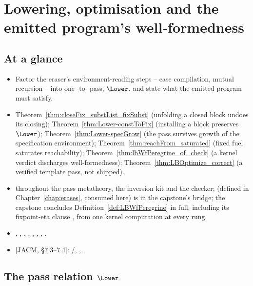 \chapter{Lowering, optimisation and the emitted program's well-formedness}
\label{chap:lowering}

\section*{At a glance}
\begin{itemize}
\item {} Factor the eraser's environment-reading steps -- case compilation, mutual recursion --
into one \lbox{}-to-\lbox{} pass, $\Lower$, and state what the emitted program must satisfy.
\item {} Theorem~\ref{thm:closeFix_substList_fixSubst} (unfolding a closed block undoes
its closing); Theorem~\ref{thm:Lower-constToFix} (installing a block preserves $\Lower$);
Theorem~\ref{thm:Lower-specGrow} (the pass survives growth of the specification environment);
Theorem~\ref{thm:reachFrom_saturated} (fixed fuel saturates reachability);
Theorem~\ref{thm:lbWfPeregrine_of_check} (a kernel verdict discharges well-formedness);
Theorem~\ref{thm:LBOptimize_correct} (a verified template pass, not shipped).
\item {} \stProved{} throughout the pass metatheory, the inversion kit and the checker;
 (defined in Chapter~\ref{chap:erases}, consumed here) is \stAssumed{} in the capstone's
bridge; the capstone concludes Definition~\ref{def:LBWfPeregrine} in full, including its fixpoint-eta
clause , from one kernel computation at every rung.
\item {} , , ,
, , , ,
.
\item {} [JACM, \S7.3--7.4]: /,
, .
\end{itemize}

\section{The pass relation \texorpdfstring{$\Lower$}{Lower}}
\label{sec:lowering:pass}

